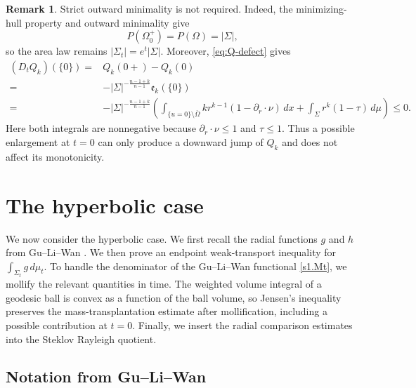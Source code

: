 \documentclass[11pt,reqno]{amsart}
\numberwithin{equation}{section}
\theoremstyle{definition}
\newtheorem{remark}[theorem]{Remark}
\newcommand{\dd}{\,d}
\begin{document}
\begin{remark}\label{rem:Euclidean-endpoint}
Strict outward minimality is not required. Indeed, the minimizing-hull property and outward minimality give
\[
    P(\Omega_0^+)=P(\Omega)=|\Sigma|,
\]
so the area law remains $|\Sigma_t|=e^t|\Sigma|$. Moreover, \eqref{eq:Q-defect} gives
\begin{align*}
     (D_t Q_k)(\{0\})=&Q_k(0+)-Q_k(0)\\
     =&-|\Sigma|^{-\frac{n-1+k}{n-1}}\mathfrak e_k(\{0\}) \\
    =&-|\Sigma|^{-\frac{n-1+k}{n-1}} \left(
      \int_{\{u=0\}\setminus\overline\Omega}
        kr^{k-1}(1-\partial_r\cdot\nu)\,dx
      +\int_\Sigma r^k(1-\tau)\,d\mu
      \right) \leq 0.
\end{align*}
Here both integrals are nonnegative because $\partial_r\cdot\nu\leq1$ and $\tau\leq1$. Thus a possible enlargement at $t=0$ can only produce a downward jump of $Q_k$ and does not affect its monotonicity.
\end{remark}

\section{The hyperbolic case}\label{sec.4}

We now consider the hyperbolic case.  We first recall the radial functions $g$ and $h$ from Gu--Li--Wan \cite{GuLiWan2025}.  We then prove an endpoint weak-transport inequality for $\int_{\Sigma_t}g\dd\mu_t$.  To handle the denominator of the Gu--Li--Wan functional \eqref{s1.Mt}, we mollify the relevant quantities in time.  The weighted volume integral of a geodesic ball is convex as a function of the ball volume, so Jensen's inequality preserves the mass-transplantation estimate after mollification, including a possible contribution at $t=0$.  Finally, we insert the radial comparison estimates into the Steklov Rayleigh quotient.

\subsection{Notation from Gu--Li--Wan \cite{GuLiWan2025}}
\end{document}
